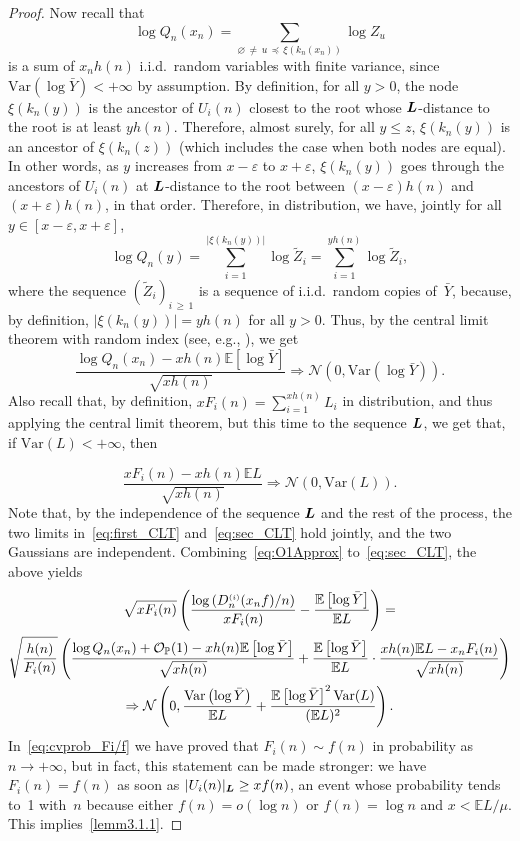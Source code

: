 \documentclass[10pt]{amsart}
\theoremstyle{definition}\newtheorem{defi}[theo]{Definition}\newtheorem{rema}[theo]{Remark}\newtheorem{exam}[theo]{Example}\newtheorem{exem}[theo]{Example}\newtheorem{nota}[theo]{Notation}
\newcommand{\bs}{\ensuremath{\boldsymbol}}
\newcommand{\sss}{\ensuremath{\scriptscriptstyle}}
\newcommand{\Op}{{\mathcal O_{\bbP}}}
\newcommand{\bbP}{\mathbb{P}}
\newcommand{\bbE}{\mathbb{E}}
\newcommand{\clN}{\mathcal{N}}
\newcommand{\Var}{\mathrm{Var}}
\begin{document}
\begin{proof}
Now recall that
\[
\log Q_n(x_n) = \sum_{\varnothing\,\neq\,u\,\preccurlyeq\,\xi(k_n(x_n))} \log Z_u
\]
is a sum of $x_n h(n)$ i.i.d.\ random variables with finite variance, since $\Var(\log \bar Y) <+\infty$ by assumption. By definition, for all $y>0$, the node $\xi(k_n(y))$ is the ancestor of $U_i(n)$ closest to the root whose $\bs L$-distance to the root is at least $yh(n)$. Therefore, almost surely, for all $y\leq z$, $\xi(k_n(y))$ is an ancestor of $\xi(k_n(z))$ (which includes the case when both nodes are equal). In other words, as $y$ increases from $x-\varepsilon$ to $x+\varepsilon$, $\xi(k_n(y))$ goes through the ancestors of $U_i(n)$ at $\bs L$-distance to the root between $(x-\varepsilon)h(n)$ and $(x+\varepsilon)h(n)$, in that order. Therefore, in distribution, we have, jointly for all $y\in[x-\varepsilon,x+\varepsilon]$,
\[
\log Q_n(y) = \sum_{i=1}^{|\xi(k_n(y))|}\log \widetilde Z_i = \sum_{i=1}^{yh(n)}\log \widetilde Z_i,
\]
where the sequence $(\widetilde Z_i)_{i\,\geq\,1}$ is a sequence of i.i.d.\ random copies of~$\bar Y$, because, by definition, $|\xi(k_n(y))| = yh(n)$ for all $y>0$. Thus, by the central limit theorem with random index (see, e.g., \cite[Theorem~3.2, Chapter~7]{Gut}), we get
\begin{equation}\label{eq:first_CLT}
\frac{\log Q_n(x_n) - xh(n)\bbE\left[\log\bar Y\right]}{\sqrt{xh(n)}}
\Rightarrow \clN\left(0,\Var(\log \bar Y)\right).
\end{equation}
Also recall that, by definition, $xF_i(n) = \sum_{i=1}^{xh(n)} L_i$ in distribution, and thus applying the central limit theorem, but this time to the sequence $\bs L$, we get that, if $\Var(L)<+\infty$, then

\begin{equation}\label{eq:sec_CLT}
\frac{xF_i(n)-xh(n)\bbE L}{\sqrt{xh(n)}} \Rightarrow \clN(0,\Var(L)).
\end{equation}
Note that, by the independence of the sequence $\bs L$ and the rest of the process, the two limits in~\eqref{eq:first_CLT} and~\eqref{eq:sec_CLT} hold jointly, and the two Gaussians are independent. Combining~\eqref{eq:O1Approx} to~\eqref{eq:sec_CLT}, the above yields
\begin{multline*}
\sqrt{xF_i(n)}\left(\frac{\log \left(D_n^{\sss (i)}(x_n f)/n\right)}{xF_i(n)} - \frac{\bbE\left[\log \bar Y\right]}{\bbE L}\right)=\\
\sqrt{\frac{h(n)}{F_i(n)}} \left(\frac{\log Q_n(x_n) +\Op(1)-xh(n)\bbE\left[\log\bar Y\right]}{\sqrt{xh(n)}} +\frac{\bbE\left[\log \bar Y\right]}{\bbE L}\cdot \frac{xh(n)\bbE L - x_n F_i(n)}{\sqrt{xh(n)}}\right)\\
\Rightarrow \clN\left(0,\frac{\Var\left(\log \bar Y\right)}{\bbE L}+\frac{\bbE\left[\log \bar Y\right]^2\Var(L)}{(\bbE L)^2}\right).
\end{multline*}
In~\eqref{eq:cvprob_Fi/f} we have proved that $F_i(n)\sim f(n)$ in probability as $n\to+\infty$, but in fact, this statement can be made stronger: we have $F_i(n) = f(n)$ as soon as $|U_i(n)|_{\bs L}\geq xf(n)$, an event whose probability tends to~1 with~$n$ because either $f(n)= o(\log n)$ or $f(n) = \log n$ and $x<\bbE L/\mu$. This implies~\eqref{lemm3.1.1}.


\end{proof}
\end{document}
